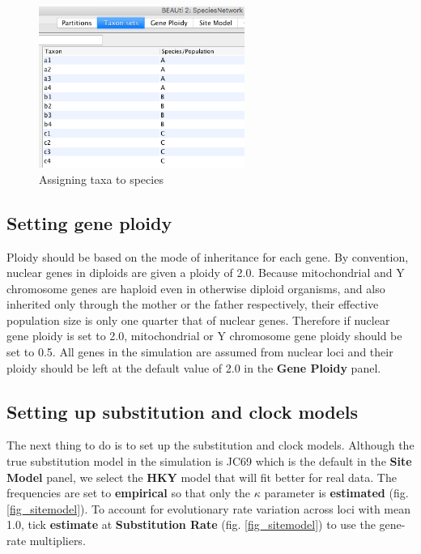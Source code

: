 \documentclass[11pt]{article}
\begin{document}
\begin{figure}[h]
\center
\includegraphics[width=0.6\textwidth]{figs/fig4_mapping}
\caption{Assigning taxa to species}
\label{fig_mapping}
\end{figure}

\subsection*{Setting gene ploidy}

Ploidy should be based on the mode of inheritance for each gene. By convention, nuclear genes in diploids are given a ploidy of 2.0. Because mitochondrial and Y chromosome genes are haploid even in otherwise diploid organisms, and also inherited only through the mother or the father respectively, their effective population size is only one quarter that of nuclear genes. Therefore if nuclear gene ploidy is set to 2.0, mitochondrial or Y chromosome gene ploidy should be set to 0.5. All genes in the simulation are assumed from nuclear loci and their ploidy should be left at the default value of 2.0 in the \textbf{Gene Ploidy} panel.

\subsection*{Setting up substitution and clock models}

The next thing to do is to set up the substitution and clock models.
Although the true substitution model in the simulation is JC69 which is the default in the \textbf{Site Model} panel, we select the \textbf{HKY} model \citep{Hasegawa:1985ww} that will fit better for real data. The frequencies are set to \textbf{empirical} so that only the $\kappa$ parameter is \textbf{estimated} (fig. \ref{fig_sitemodel}).
To account for evolutionary rate variation across loci with mean 1.0, tick \textbf{estimate} at \textbf{Substitution Rate} (fig. \ref{fig_sitemodel}) to use the gene-rate multipliers.
\end{document}

